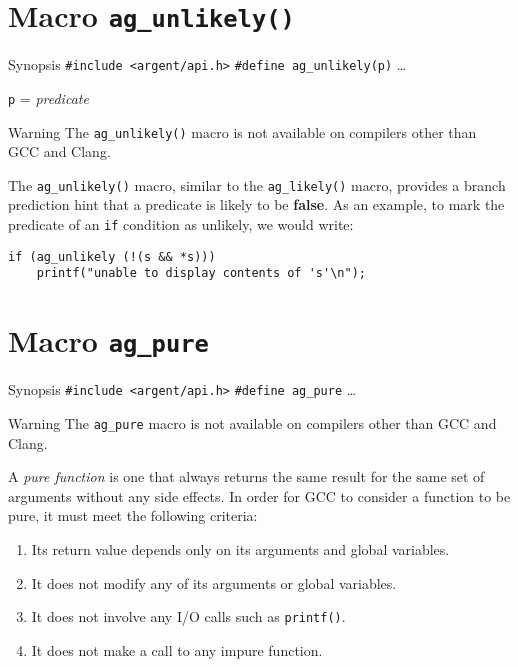 \section{Macro \texttt{ag\_unlikely()}}

\begin{bclogo}[logo=\bccrayon, noborder=true, barre=snake, couleurBarre=gray]
    {Synopsis}
  \verb|#include <argent/api.h>|
  \verb|#define ag_unlikely(p)| \ldots
  \par
  \texttt{p} = \emph{predicate}
\end{bclogo}

\begin{bclogo}[logo=\bctakecare, noborder=true, couleurBarre=orange]{Warning}
  The \verb|ag_unlikely()| macro is not available on compilers other than GCC 
  and Clang.
\end{bclogo}

The \verb|ag_unlikely()| macro, similar to the \verb|ag_likely()| macro,
provides a branch prediction hint that a predicate is likely to be 
\textbf{false}. As an example, to mark the predicate of an \verb|if| condition 
as unlikely, we would write:

\begin{lstlisting}[linewidth=1.0\linewidth]
if (ag_unlikely (!(s && *s))) 
    printf("unable to display contents of 's'\n");
\end{lstlisting}


\section{Macro \texttt{ag\_pure}}

\begin{bclogo}[logo=\bccrayon, noborder=true, barre=snake, couleurBarre=gray]
    {Synopsis}
  \verb|#include <argent/api.h>|
  \verb|#define ag_pure| \ldots
\end{bclogo}

\begin{bclogo}[logo=\bctakecare, noborder=true, couleurBarre=orange]{Warning}
  The \verb|ag_pure| macro is not available on compilers other than GCC and
  Clang.
\end{bclogo}

A \emph{pure function} is one that always returns the same result for the same
set of arguments without any side effects. In order for GCC to consider a
function to be pure, it must meet the following criteria:
\begin{enumerate}
  \item Its return value depends only on its arguments and global variables.
  \item It does not modify any of its arguments or global variables.
  \item It does not involve any I/O calls such as \texttt{printf()}.
  \item It does not make a call to any impure function.
\end{enumerate}

